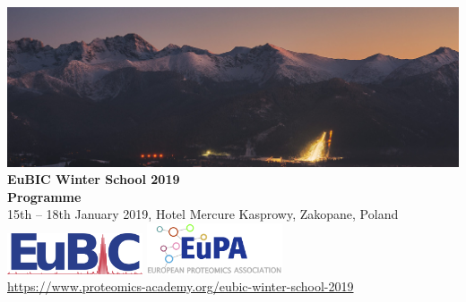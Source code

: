 \thispagestyle{empty}
\begin{titlepage}
	\begin{center}
    \includegraphics[width=\textwidth]{graphics/ski-jumping-wallpapers-small.jpg}\\
    \vspace*{\fill}
		{\huge \color{eubicRed} \textbf{EuBIC Winter School 2019}\\[1cm]}
    {\LARGE \textbf{Programme}\\[1cm]}
    {\color{eubicGray} 15th -- 18th January 2019, Hotel Mercure Kasprowy, Zakopane, Poland}\\
    \vspace*{3cm}
    \includegraphics[width=0.3\textwidth]{graphics/eubic_logo.png}
    \hspace*{2cm}
    \includegraphics[width=0.3\textwidth]{graphics/eupa-logo.png}\\[1cm]
    {\href{https://www.proteomics-academy.org/eubic-winter-school-2019}{https://www.proteomics-academy.org/eubic-winter-school-2019}\\[0.5cm]}
	\end{center}
  \vspace*{\fill}
\end{titlepage}
